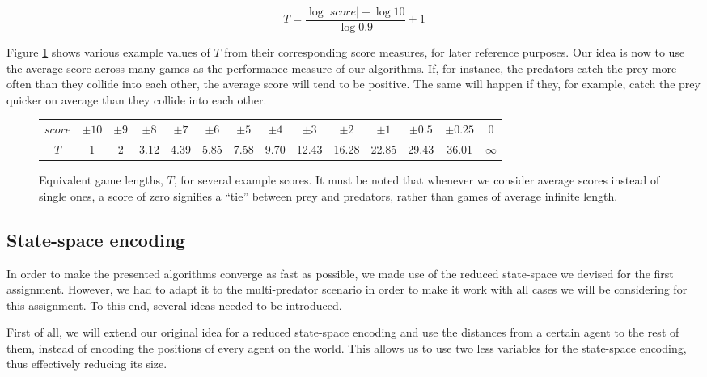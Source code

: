 \documentclass[a4paper,12pt]{article}
\begin{document}
$$ T = \frac{\log | score | - \log 10}{\log 0.9} + 1$$

Figure \ref{fig:scores} shows various example values of $T$ from their corresponding score measures, for later reference purposes. Our idea is now to use the average score across many games as the performance measure of our algorithms. If, for instance, the predators catch the prey more often than they collide into each other, the average score will tend to be positive. The same will happen if they, for example, catch the prey quicker on average than they collide into each other.

\begin{figure}[ht!]
\centering
 \begin{tabular}{c|ccccccccccccc}
  $score$ & $\pm10$ & $\pm9$ & $\pm8$ & $\pm7$ & $\pm6$ & $\pm5$ & $\pm4$ & $\pm3$& $\pm2$ & $\pm1$ & $\pm0.5$ & $\pm0.25$ & $0$ \\
  $T$ & 1 & 2 & 3.12 & 4.39 & 5.85 & 7.58 & 9.70 & 12.43 & 16.28 & 22.85 & 29.43 & 36.01 & $\infty$ \\
 \end{tabular}
\caption{Equivalent game lengths, $T$, for several example scores. It must be noted that whenever we consider average scores instead of single ones, a score of zero signifies a ``tie'' between prey and predators, rather than games of average infinite length.}
\label{fig:scores}
\end{figure}


\subsection{State-space encoding}

In order to make the presented algorithms converge as fast as possible, we made use of the reduced state-space we devised for the first assignment. However, we had to adapt it to the multi-predator scenario in order to make it work with all cases we will be considering for this assignment. To this end, several ideas needed to be introduced.

First of all, we will extend our original idea for a reduced state-space encoding and use the distances from a certain agent to the rest of them, instead of encoding the positions of every agent on the world. This allows us to use two less variables for the state-space encoding, thus effectively reducing its size. 
\end{document}
